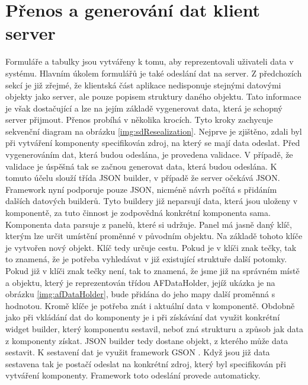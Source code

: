 \section{Přenos a generování dat klient server}
Formuláře a tabulky jsou vytvářeny k tomu, aby reprezentovali uživateli data v systému. Hlavním úkolem formulářů je také odeslání dat na server. Z předchozích sekcí je již zřejmé, že klientská část aplikace nedisponuje stejnými datovými objekty jako server, ale pouze popisem struktury daného objektu. Tato informace je však dostačující a lze na jejím základě vygenerovat data, která je schopný server přijmout. Přenos probíhá v několika krocích. Tyto kroky zachycuje sekvenční diagram na obrázku \ref{img:sdResealization}. Nejprve je zjištěno, zdali byl při vytváření komponenty specifikován zdroj, na který se mají data odeslat. Před vygenerováním dat, která budou odeslána, je provedena validace. V případě, že validace je úspěšná tak se začnou generovat data, která budou odeslána. K tomuto účelu slouží třída JSON builder, v případě že server očekává JSON. Framework nyní podporuje pouze JSON, nicméně návrh počítá s přidáním dalších datových builderů. Tyto buildery již neparsují data, která jsou uloženy v komponentě, za tuto činnost je zodpovědná konkrétní komponenta sama. Komponenta data parsuje z panelů, které si udržuje. Panel má jasně daný klíč, kterým lze určit umístění proměnné v původním objektu. Na základě tohoto klíče je vytvořen nový objekt. Klíč tedy určuje cestu. Pokud je v klíči znak tečky, tak to znamená, že je potřeba vyhledávat v již existující struktuře další potomky. Pokud již v klíči znak tečky není, tak to znamená, že jsme již na správném místě a objektu, který je reprezentován třídou AFDataHolder, jejíž ukázka je na obrázku \ref{img:afDataHolder}, bude přidána do jeho mapy další proměnná s hodnotou. Kromě klíče je potřeba znát i aktuální data v komponentě. Obdobně jako při vkládání dat do komponenty je i při získávání dat využit konkrétní widget builder, který komponentu sestavil, neboť zná strukturu a způsob jak data z komponenty získat. JSON builder tedy dostane objekt, z kterého může data sestavit. K sestavení dat je využit framework GSON \cite{gson}. Když jsou již data sestavena tak je postačí odeslat na konkrétní zdroj, který byl specifikován při vytváření komponenty. Framework toto odeslání provede automaticky.


